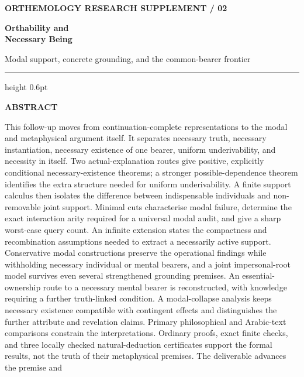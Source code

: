 \documentclass[11pt,a4paper]{article}
\begin{document}
\begin{titlepage}
\thispagestyle{empty}
\vspace*{5mm}
{\sffamily\small\bfseries\color{ink} ORTHEMOLOGY \hfill RESEARCH SUPPLEMENT / 02\par}
\vspace{15mm}
{\sffamily\fontsize{30}{35}\selectfont\bfseries\color{ink} Orthability and\\[2pt]Necessary Being\par}
\vspace{6mm}
{\sffamily\large\color{softink} Modal support, concrete grounding, and
the common-bearer frontier\par}
\vspace{10mm}
{\color{hairline}\hrule height 0.6pt}
\vspace{8mm}
{\sffamily\small\bfseries\color{ink} ABSTRACT\par}
\vspace{2mm}
This follow-up moves from continuation-complete representations to the
modal and metaphysical argument itself. It separates necessary truth,
necessary instantiation, necessary existence of one bearer, uniform
underivability, and necessity in itself. Two actual-explanation routes
give positive, explicitly conditional necessary-existence theorems; a
stronger possible-dependence theorem identifies the extra structure
needed for uniform underivability. A finite support calculus then
isolates the difference between indispensable individuals and
non-removable joint support. Minimal cuts characterise modal failure,
determine the exact interaction arity required for a universal modal
audit, and give a sharp worst-case query count. An infinite extension
states the compactness and recombination assumptions needed to extract a
necessarily active support. Conservative modal constructions preserve
the operational findings while withholding necessary individual or
mental bearers, and a joint impersonal-root model survives even several
strengthened grounding premises. An essential-ownership route to a
necessary mental bearer is reconstructed, with knowledge requiring a
further truth-linked condition. A modal-collapse analysis keeps
necessary existence compatible with contingent effects and distinguishes
the further attribute and revelation claims. Primary philosophical and
Arabic-text comparisons constrain the interpretations. Ordinary proofs,
exact finite checks, and three locally checked natural-deduction
certificates support the formal results, not the truth of their
metaphysical premises. The deliverable advances the premise and

\end{titlepage}
\end{document}
